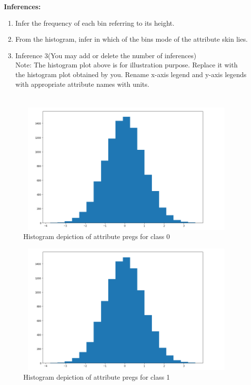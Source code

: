 \documentclass[12 pt, a4paper]{article}
\theoremstyle{definition}
\begin{document}
\textbf{\Large Inferences:}
\begin{enumerate}
      \item Infer the frequency of each bin referring to its height.
   \item From the histogram, infer in which of the bins mode of the attribute skin lies.

   \item Inference 3(You may add or delete the number of inferences)
\\Note: The histogram plot above is for illustration purpose. Replace it with the histogram plot obtained by you. Rename x-axis legend and y-axis legends with appropriate attribute names with units.

\end{enumerate}

\section{}
\begin{figure}[H]
	\centering
	\includegraphics[width=11.5cm,height=6.65cm]{histogram.png}
	\caption{Histogram depiction of attribute pregs for class 0}
	\label{Blockdia}
\end{figure}

\begin{figure}[H]
	\centering
	\includegraphics[width=11.5cm,height=6.65cm]{histogram.png}
	\caption{Histogram depiction of attribute pregs for class 1}
	\label{Blockdia}
\end{figure}
\end{document}
